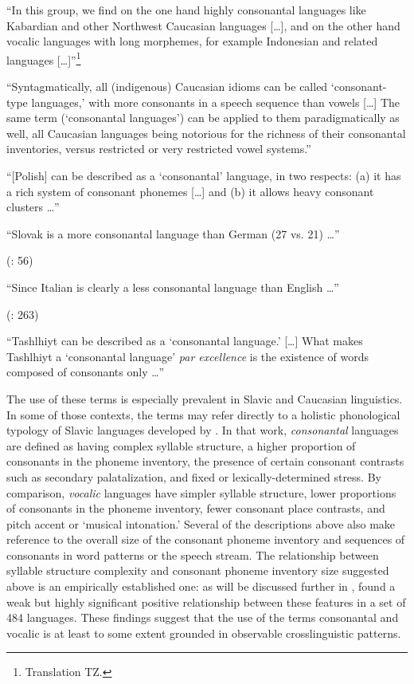 \ea\label{ex:1.13}
   “In this group, we find on the one hand highly consonantal languages like Kabardian and other Northwest Caucasian languages […], and on the other hand vocalic languages with long morphemes, for example Indonesian and related languages […]”\footnote{{Translation TZ.}}

\citep[309]{Skalička1979}
\z

\ea\label{ex:1.14}
   “Syntagmatically, all (indigenous) Caucasian idioms can be called ‘consonant-type languages,’ with more consonants in a speech sequence than vowels […] The same term (‘consonantal languages’) can be applied to them paradigmatically as well, all Caucasian languages being notorious for the richness of their consonantal inventories, versus restricted or very restricted vowel systems.” 
\citep[43]{Chirikba2008}
\z

\ea\label{ex:1.15}
  “[Polish] can be described as a ‘consonantal’ language, in two respects: 
  (a) it has a rich system of consonant phonemes […] and (b) it allows heavy consonant clusters …” 
\citep[103]{Jassem2003}
\z

\ea\label{ex:1.16}
   “Slovak is a more consonantal language than German (27 vs. 21) …”

(\citealt{DresslerEtAl2015}: 56)
\z

\ea\label{ex:1.17}
  “Since Italian is clearly a less consonantal language than English …” 

(\citealt{DresslerDziubalska-Kołaczyk2006}: 263)
\z

\ea\label{ex:1.18}
  “Tashlhiyt can be described as a ‘consonantal language.’ […] What makes Tashlhiyt a ‘consonantal language’ \textit{par excellence} is the existence of words composed of consonants only …” 
\z
\citep[216]{Ridouane2014}

  The use of these terms is especially prevalent in Slavic and Caucasian linguistics. In some of those contexts, the terms may refer directly to a holistic phonological typology of Slavic languages developed by \citet{Isačenko1939/1940}. In that work, \textit{consonantal} languages are defined as having complex syllable structure, a higher proportion of consonants in the phoneme inventory, the presence of certain consonant contrasts such as secondary palatalization, and fixed or lexically-determined stress. By comparison, \textit{vocalic} languages have simpler syllable structure, lower proportions of consonants in the phoneme inventory, fewer consonant place contrasts, and pitch accent or ‘musical intonation.’ Several of the descriptions above also make reference to the overall size of the consonant phoneme inventory and sequences of consonants in word patterns or the speech stream. The relationship between syllable structure complexity and consonant phoneme inventory size suggested above is an empirically established one: as will be discussed further in , \citet{Maddieson2013a} found a weak but highly significant positive relationship between these features in a set of 484 languages. These findings suggest that the use of the terms consonantal and vocalic is at least to some extent grounded in observable crosslinguistic patterns.

